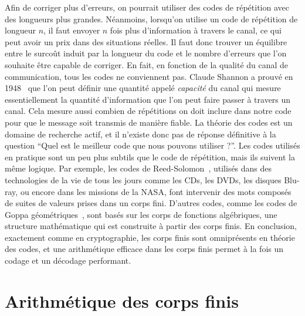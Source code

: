 Afin de corriger plus d'erreurs, on pourrait utiliser des codes de répétition
avec des longueurs plus grandes. Néanmoins, lorsqu'on utilise un code de
répétition de longueur $n$, il faut envoyer $n$ fois plus d'information à
travers le canal, ce qui peut avoir un prix dans des situations réelles. Il faut
donc trouver un équilibre entre le surcoût induit par la longueur du code et le
nombre d'erreurs que l'on souhaite être capable de corriger. En fait, en
fonction de la qualité du canal de communication, tous les codes ne conviennent
pas. Claude Shannon a prouvé en 1948~\cite{Shannon48} que l'on peut définir une
quantité appelé \emph{capacité} du canal qui mesure essentiellement la quantité
d'information que l'on peut faire passer à travers un canal. Cela mesure aussi
combien de répétitions on doit inclure dans notre code pour que le message soit
transmis de manière fiable. La théorie des codes est un domaine de recherche
actif, et il n'existe donc pas de réponse définitive à la question ``Quel est le
meilleur code que nous pouvons utiliser ?''. Les codes utilisés en pratique sont
un peu plus subtils que le code de répétition, mais ils suivent la même logique.
Par exemple, les codes de Reed-Solomon~\cite{RS60}, utilisés dans des
technologies de la vie de tous les jours comme les CDs, les DVDs, les disques
Blu-ray, ou encore dans les missions de la NASA, font intervenir des mots
composés de suites de valeurs prises dans un corps fini. D'autres codes, comme
les codes de Goppa géométriques~\cite{Goppa81}, sont basés sur les corps de
fonctions algébriques, une structure mathématique qui est construite à partir
des corps finis. En conclusion, exactement comme en cryptographie, les corps
finis sont omniprésents en théorie des codes, et une arithmétique efficace dans
les corps finis permet à la fois un codage et un décodage performant.

\section*{Arithmétique des corps finis}

